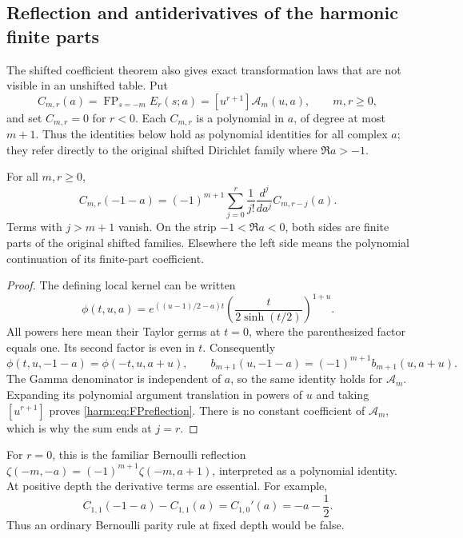 \subsection{Reflection and antiderivatives of the harmonic finite parts}
\label{harm:subsec:symmetries}

The shifted coefficient theorem also gives exact transformation laws
that are not visible in an unshifted table. Put
\[
 C_{m,r}(a)=\operatorname{FP}_{s=-m}E_r(s;a)
          =[u^{r+1}]\mathcal A_m(u,a),\qquad m,r\geq0,
\]
and set \(C_{m,r}=0\) for \(r<0\).
Each \(C_{m,r}\) is a polynomial in \(a\), of degree at most \(m+1\).
Thus the identities below hold as polynomial identities for all complex
\(a\); they refer directly to the original shifted Dirichlet family
where \(\Re a>-1\).

\begin{theorem}
\label{harm:thm:reflection}
For all \(m,r\geq0\),
\begin{equation}\label{harm:eq:FPreflection}
 C_{m,r}(-1-a)
 =(-1)^{m+1}\sum_{j=0}^{r}
          \frac{1}{j!}\frac{d^j}{da^j}C_{m,r-j}(a).
\end{equation}
Terms with \(j>m+1\) vanish. On the strip \(-1<\Re a<0\),
both sides are finite parts of the original shifted families.
Elsewhere the left side means the polynomial continuation of its
finite-part coefficient.
\end{theorem}

\begin{proof}
The defining local kernel can be written
\[
 \phi(t,u,a)=
 e^{((u-1)/2-a)t}
 \left(\frac{t}{2\sinh(t/2)}\right)^{1+u}.
\]
All powers here mean their Taylor germs at \(t=0\), where the
parenthesized factor equals one. Its second factor is even in \(t\).
Consequently
\[
 \phi(t,u,-1-a)=\phi(-t,u,a+u),\qquad
 b_{m+1}(u,-1-a)=(-1)^{m+1}b_{m+1}(u,a+u).
\]
The Gamma denominator is independent of \(a\), so the same identity
holds for \(\mathcal A_m\). Expanding its polynomial argument
translation in powers of \(u\) and taking \([u^{r+1}]\) proves
\eqref{harm:eq:FPreflection}. There is no constant coefficient of
\(\mathcal A_m\), which is why the sum ends at \(j=r\).
\end{proof}

For \(r=0\), this is the familiar Bernoulli reflection
\(\zeta(-m,-a)=(-1)^{m+1}\zeta(-m,a+1)\), interpreted as a polynomial
identity. At positive depth the derivative terms are essential.
For example,
\[
 C_{1,1}(-1-a)-C_{1,1}(a)
 =C_{1,0}'(a)=-a-\frac12.
\]
Thus an ordinary Bernoulli parity rule at fixed depth would be false.

